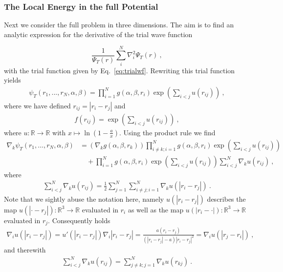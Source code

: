 \documentclass[11pt,a4paper]{article}
\numberwithin{equation}{section}
\begin{document}
\subsubsection{The Local Energy in the full Potential}
%
%
Next we consider the full problem in three dimensions.
%
The aim is to find an analytic expression for the derivative of the trial wave function

\begin{equation*}
\frac{1}{\Psi_T({r})}\sum_i^{N}\nabla_i^2\Psi_T({r})~,
\end{equation*}
with the trial function given by Eq.~\eqref{eq:trialwf}.
%
Rewriting this trial function yields
\begin{align*}
\psi_T(r_1,...,r_N,\alpha,\beta)=\prod_{i=1}^N g(\alpha,\beta,{r}_i)\exp{\left(\sum_{i<j}u(r_{ij})\right)}~,
\end{align*}
where we have defined $r_{ij}=|{r}_i-{r}_j|$ and 
\begin{align*}
f(r_{ij})= \exp{\left(\sum_{i<j}u(r_{ij})\right)}~,
\end{align*}
where $u:\mathbb{R}\to \mathbb{R}$ with $x\mapsto \ln \left(1-\frac{a}{x}\right)$.
%
Using the product rule we find
\begin{equation}
\label{eq:gradientTrialFunk}
\begin{aligned}
\nabla_k\psi_T(r_1,...,r_N,\alpha,\beta)
&=
\left(\nabla_kg(\alpha,\beta,{r}_k)\right)\prod_{i\neq k;i=1}^N g(\alpha,\beta,{r}_i)\exp{\left(\sum_{i<j}u(r_{ij})\right)}\\
&\quad +\prod_{i=1}^N g(\alpha,\beta,{r}_i)\exp{\left(\sum_{i<j}u(r_{ij})\right)}\sum_{i<j}^N\nabla_ku(r_{ij})~,
\end{aligned}
\end{equation}
where 
\begin{align*}
\sum_{i<j}^N\nabla_ku(r_{ij})
=
\frac{1}{2}\sum_{j=1}^N\sum_{i\neq j;i=1}^N\nabla_k u(|r_i-r_j|) ~.
\end{align*}
Note that we sightly abuse the notation here, namely $u(|r_i-r_j|)$ describes the map $u(|\cdot -r_j|):\mathbb{R}^3\to \mathbb{R}$ evaluated in $r_i$ as well as the map $u(|r_i -\cdot|):\mathbb{R}^3\to \mathbb{R}$ evaluated in $r_j$.
%
Consequently holds
\begin{align}
\label{eq:nablaU}
\nabla_i u(|r_i-r_j|)
=
u'(|r_i-r_j|)\nabla_i |r_i-r_j|
=
\frac{a(r_i-r_j)}{(|r_i-r_j|-a)|r_i-r_j|^2}=\nabla_i u(|r_j-r_i|)~,
\end{align} 
and therewith
\begin{align*}
\sum_{i<j}^N\nabla_ku(r_{ij})
=\sum_{j\neq k;j=1}^N\nabla_k u(r_{kj})~.
\end{align*}
\end{document}
